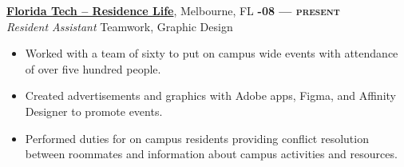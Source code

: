 \documentclass[margin,10pt]{res}
\begin{document}
\begin{resume}
        \href{https://www.fit.edu/reslife/}{\textbf{Florida Tech -- Residence Life}}, Melbourne, FL
        \hfill
        \textsc{\bfseries{}-08 --- present}
        \\
        \textit{Resident Assistant}
        \hfill
        Teamwork, Graphic Design
        \vspace{0.5em}
        \begin{itemize}
            \item Worked with a team of sixty to put on campus wide events with attendance of over five hundred people.
            \item Created advertisements and graphics with Adobe apps, Figma, and Affinity Designer to promote events.
            \item Performed duties for on campus residents providing conflict resolution between roommates and information about campus activities and resources.
        \end{itemize}
\end{resume}

\vfill

\end{document}
